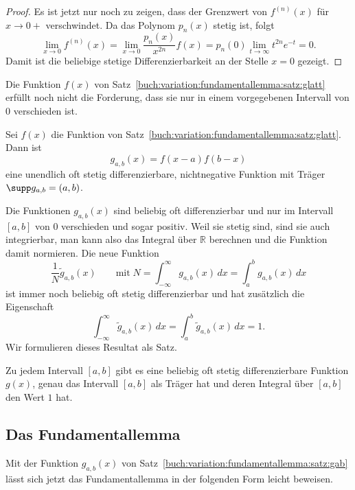 \begin{proof}
Es ist jetzt nur noch zu zeigen, dass der Grenzwert von $f^{(n)}(x)$
für $x\to 0+$ verschwindet.
Da das Polynom $p_n(x)$ stetig ist, folgt
\[
\lim_{x\to 0}
f^{(n)}(x)
=
\lim_{x\to 0}\frac{p_n(x)}{x^{2n}}f(x)
=
p_n(0) \lim_{t\to\infty} t^{2n} e^{-t}
=
0.
\]
Damit ist die beliebige stetige Differenzierbarkeit an der Stelle
$x=0$ gezeigt.
\end{proof}

Die Funktion $f(x)$ von 
Satz~\ref{buch:variation:fundamentallemma:satz:glatt} 
erfüllt noch nicht die Forderung, dass sie nur in einem vorgegebenen
Intervall von $0$ verschieden ist.



\begin{satz}
\label{buch:variation:fundamentallemma:satz:gab}
Sei $f(x)$ die Funktion von
Satz~\ref{buch:variation:fundamentallemma:satz:glatt}.
Dann ist
\[
g_{a,b}(x)
=
f(x-a) f(b-x)
\]
eine unendlich oft stetig differenzierbare, nichtnegative Funktion mit Träger
$\supp g_{a,b}=(a,b)$.
\end{satz}

Die Funktionen $g_{a,b}(x)$ sind beliebig oft differenzierbar und nur im
Intervall $[a,b]$ von $0$ verschieden und sogar positiv.
Weil sie stetig sind, sind sie auch integrierbar, man kann also das
Integral über $\mathbb{R}$ berechnen und die Funktion damit normieren.
Die neue Funktion
\[
\frac{1}{N}
\tilde{g}_{a,b}(x)
\qquad\text{mit}\;
N
=
\int_{-\infty}^{\infty}g_{a,b}(x)\,dx
=
\int_a^b g_{a,b}(x)\,dx
\]
ist immer noch beliebig oft stetig differenzierbar und hat zusätzlich die
Eigenschaft
\[
\int_{-\infty}^{\infty}
\tilde{g}_{a,b}(x)\,dx
=
\int_a^b
\tilde{g}_{a,b}(x)\,dx
=
1.
\]
Wir formulieren dieses Resultat als Satz.

\begin{satz}
\label{buch:variation:satz:gabeins}
Zu jedem Intervall $[a,b]$ gibt es eine beliebig oft stetig
differenzierbare Funktion $g(x)$, genau das Intervall $[a,b]$
als Träger hat und deren Integral über $[a,b]$ den Wert $1$ hat.
\end{satz}

%
%
\subsection{Das Fundamentallemma}
Mit der Funktion $g_{a,b}(x)$ von
Satz~\ref{buch:variation:fundamentallemma:satz:gab}
lässt sich jetzt das Fundamentallemma in der folgenden Form
leicht beweisen.

